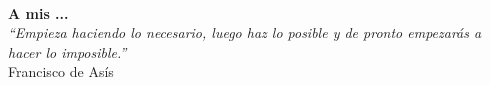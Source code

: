 %

\thispagestyle{empty}

\begin{flushright}

  \textbf{} \\
  \vspace{6cm}

  \textbf{A mis ...}\\
  \vspace{3cm}
  \hspace{8cm}
  \emph{``Empieza haciendo lo necesario, luego haz lo posible y de
    pronto empezarás a hacer lo imposible.''}\\ Francisco de Asís

\end{flushright}

